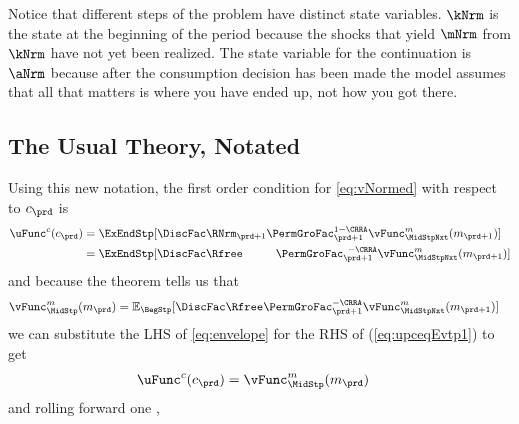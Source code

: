Notice that different steps of the problem have distinct state variables.  $\kNrm$ is the state at the beginning of the period because the shocks that yield $\mNrm$ from $\kNrm$ have not yet been realized. The state variable for the continuation {\move} is $\aNrm$ because after the consumption decision has been made the model assumes that all that matters is where you have ended up, not how you got there.

\subsection{The Usual Theory, Notated}

Using this new notation, the first order condition for \eqref{eq:vNormed} with respect to ${c}_{\prd}$ is
\begin{equation}\begin{gathered}\begin{aligned}
      \uFunc^{{c}}({c}_{\prd})  & = \ExEndStp[\DiscFac \RNrm_{\prd+1}\PermGroFac_{\prd+1}^{1-\CRRA}{\vFunc}^{{m}}_{\MidStpNxt}({m}_{\prd+1})]  \label{eq:upceqEvtp1}
      \\                        & =  \ExEndStp[\DiscFac\Rfree\phantom{._{\prd+1}}\PermGroFac_{\prd+1}^{\phantom{1}-\CRRA}{\vFunc}^{{m}}_{\MidStpNxt}({m}_{\prd+1})]
    \end{aligned}\end{gathered}\end{equation}
and because the  theorem tells us that
\begin{equation}\begin{gathered}\begin{aligned}
      {\vFunc}^{{m}}_{\MidStp}({m}_{\prd})  & =  \Ex_{\BegStp} [\DiscFac\Rfree\PermGroFac_{\prd+1}^{-\CRRA}{\vFunc}^{{m}}_{\MidStpNxt}({m}_{\prd+1})] \label{eq:envelope}
    \end{aligned}\end{gathered}\end{equation}
we can substitute the LHS of \eqref{eq:envelope} for the RHS of
(\ref{eq:upceqEvtp1}) to get
  \begin{equation}\begin{gathered}\begin{aligned}
        \uFunc^{{c}}({c}_{\prd})  & = {\vFunc}^{{m}}_{\MidStp}({m}_{\prd})\label{eq:upcteqvtp}
      \end{aligned}\end{gathered}\end{equation}
and rolling forward one {\interval},
